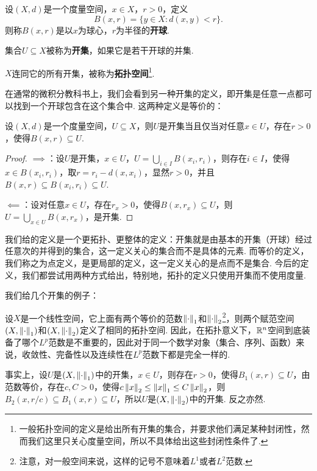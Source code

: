 \begin{definition}[开球，开集，拓扑空间]
    设$(X,d)$是一个度量空间，$x\in X$，$r>0$，定义
    \[B(x,r)=\{y\in X:d(x,y)<r\}.\]
    则称$B(x,r)$是以$x$为球心，$r$为半径的\textbf{开球}. 
    
    集合$U\subseteq X$被称为\textbf{开集}，如果它是若干开球的并集. 

    $X$连同它的所有开集，被称为\textbf{拓扑空间}\footnote{一般拓扑空间的定义是给出所有开集的集合，并要求他们满足某种封闭性，然而我们这里只关心度量空间，所以不具体给出这些封闭性条件了. }. 
\end{definition}
在通常的微积分教科书上，我们会看到另一种开集的定义，即开集是任意一点都可以找到一个开球包含在这个集合中. 这两种定义是等价的：

\begin{proposition}\label{prop:open-ball}
    设$(X,d)$是一个度量空间，$U\subseteq X$，则$U$是开集当且仅当对任意$x\in U$，存在$r>0$，使得$B(x,r)\subseteq U$.
\end{proposition}
\begin{proof}
   $\implies$：设$U$是开集，$x\in U$，$U=\bigcup_{i\in I}B(x_i,r_i)$，则存在$i\in I$，使得$x\in B(x_i,r_i)$，取$r=r_i-d(x,x_i)$，显然$r>0$，并且$B(x,r)\subseteq B(x_i,r_i)\subseteq U$.

    $\impliedby$：设对任意$x\in U$，存在$r_x>0$，使得$B(x,r_x)\subseteq U$，则$U=\bigcup_{x\in U}B(x,r_x)$，是开集. 
\end{proof}
我们给的定义是一个更拓扑、更整体的定义：开集就是由基本的开集（开球）经过任意次的并得到的集合，这一定义关心的集合而不是具体的元素. 而等价的定义，我们称之为点定义，是更局部的定义，这一定义关心的是点而不是集合. 今后的定义，我们都尝试用两种方式给出，特别地，拓扑的定义只使用开集而不使用度量. 


我们给几个开集的例子：
\begin{example}[范等价拓扑空间]
    设$X$是一个线性空间，它上面有两个等价的范数$\left\|\cdot\right\|_1$和$\left\|\cdot\right\|_2$\footnote{注意，对一般空间来说，这样的记号不意味着$L^1$或者$L^2$范数. }，则两个赋范空间$(X,\left\|\cdot\right\|_1)$和$(X,\left\|\cdot\right\|_2)$定义了相同的拓扑空间. 因此，在拓扑意义下，$\mathbb{R}^n$空间到底装备了哪个$L^p$范数是不重要的，因此对于同一个数学对象（集合、序列、函数）来说，收敛性、完备性以及连续性在$L^p$范数下都是完全一样的. 

    事实上，设$U$是$(X,\left\|\cdot\right\|_1)$中的开集，$x\in U$，则存在$r>0$，使得$B_1(x,r)\subseteq U$，由范数等价，存在$c,C>0$，使得$c\left\|x\right\|_2\leq \left\|x\right\|_1\leq C\left\|x\right\|_2$，则$B_2(x,r/c)\subseteq B_1(x,r)\subseteq U$，所以$U$是$(X,\left\|\cdot\right\|_2)$中的开集. 反之亦然. 
\end{example}

